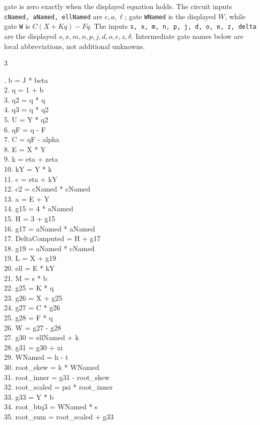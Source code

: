 \documentclass[10pt]{article}
\begin{document}
gate is zero exactly when the displayed equation holds. The circuit inputs
\texttt{cNamed, aNamed, ellNamed} are $c,a,\ell$; gate \texttt{WNamed} is the
displayed $W$, while gate \texttt{W} is $C(X+Kq)-Fq$. The inputs
\texttt{s, x, m, n, p, j, d, o, e, z, delta} are the displayed
$s,x,m,n,p,j,d,o,e,z,\delta$. Intermediate gate
names below are local abbreviations, not additional unknowns.
\begin{multicols}{3}
\raggedright\ttfamily\fontsize{7.2}{8.4}. b = J * beta\\
2. q = 1 + b\\
3. q2 = q * q\\
4. q3 = q * q2\\
5. U = Y * q2\\
6. qF = q - F\\
7. C = qF - alpha\\
8. E = X * Y\\
9. k = eta + zeta\\
10. kY = Y * k\\
11. c = eta + kY\\
12. c2 = cNamed * cNamed\\
13. a = E + Y\\
14. g15 = 4 * aNamed\\
15. H = 3 + g15\\
16. g17 = aNamed * aNamed\\
17. DeltaComputed = H + g17\\
18. g19 = aNamed * cNamed\\
19. L = X + g19\\
20. ell = E * kY\\
21. M = s * b\\
22. g25 = K * q\\
23. g26 = X + g25\\
24. g27 = C * g26\\
25. g28 = F * q\\
26. W = g27 - g28\\
27. g30 = ellNamed + k\\
28. g31 = g30 + xi\\
29. WNamed = h - t\\
30. root\_skew = k * WNamed\\
31. root\_inner = g31 - root\_skew\\
32. root\_scaled = psi * root\_inner\\
33. g33 = Y * b\\
34. root\_btq3 = WNamed * s\\
35. root\_sum = root\_scaled + g33\\

\end{multicols}
\end{document}
